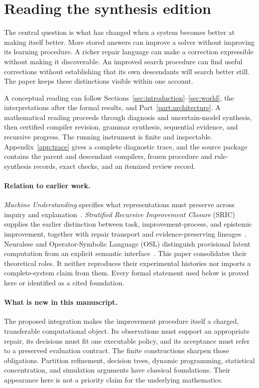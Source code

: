 \documentclass[11pt,letterpaper]{article}
\theoremstyle{plain}
\theoremstyle{definition}
\begin{document}
\section*{Reading the synthesis edition}
The central question is what has changed when a system becomes better at making itself better. More stored answers can improve a solver without improving its learning procedure. A richer repair language can make a correction expressible without making it discoverable. An improved search procedure can find useful corrections without establishing that its own descendants will search better still. The paper keeps these distinctions visible within one account.

A conceptual reading can follow Sections~\ref{sec:introduction}--\ref{sec:world}, the interpretations after the formal results, and Part~\ref{part:architecture}. A mathematical reading proceeds through diagnosis and uncertain-model synthesis, then certified compiler revision, grammar synthesis, sequential evidence, and recursive progress. The running instrument is finite and inspectable. Appendix~\ref{app:trace} gives a complete diagnostic trace, and the source package contains the parent and descendant compilers, frozen procedure and rule-synthesis records, exact checks, and an itemized review record.

\paragraph{Relation to earlier work.}
\emph{Machine Understanding} specifies what representations must preserve across inquiry and explanation~\cite{understanding}. \emph{Stratified Recursive Improvement Closure} (SRIC) supplies the earlier distinction between task, improvement-process, and epistemic improvement, together with repair transport and evidence-preserving lineages~\cite{sric}. Neuralese and Operator-Symbolic Language (OSL) distinguish provisional latent computation from an explicit semantic interface~\cite{neuralese,osl}. This paper consolidates their theoretical roles. It neither reproduces their experimental histories nor imports a complete-system claim from them. Every formal statement used below is proved here or identified as a cited foundation.

\paragraph{What is new in this manuscript.}
The proposed integration makes the improvement procedure itself a charged, transferable computational object. Its observations must support an appropriate repair, its decisions must fit one executable policy, and its acceptance must refer to a preserved evaluation contract. The finite constructions sharpen those obligations. Partition refinement, decision trees, dynamic programming, statistical concentration, and simulation arguments have classical foundations. Their appearance here is not a priority claim for the underlying mathematics.
\end{document}
